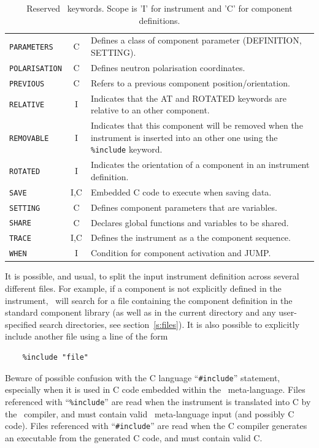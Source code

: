 \begin{table}
\begin{center}
{\begin{tabular}{|l|c|p{}|}
      \texttt{PARAMETERS} & C & Defines a class of component parameter (DEFINITION, SETTING). \\
      \texttt{POLARISATION} & C & Defines neutron polarisation coordinates. \\
      \texttt{PREVIOUS} & C & Refers to a previous component position/orientation.\\
      \texttt{RELATIVE} & I & Indicates that the AT and ROTATED keywords are relative to an other component. \\
      \texttt{REMOVABLE} & I & Indicates that this component will be removed when the instrument is inserted into an other one using the \texttt{\%include} keyword. \\
      \texttt{ROTATED} & I & Indicates the orientation of a component in an instrument definition. \\
      \texttt{SAVE} & I,C & Embedded C code to execute when saving data. \\
      \texttt{SETTING} & C & Defines component parameters that are
      variables. \\
      \texttt{SHARE} & C & Declares global functions and variables to be shared. \\
      \texttt{TRACE} & I,C & Defines the instrument as a the component sequence. \\
      \texttt{WHEN}  & I & Condition for component activation and JUMP.\\
      \hline
    \end{tabular}
    \caption{Reserved \MCS\ keywords.
    Scope is 'I' for instrument and 'C' for component definitions.}
    \label{t:keywords}
    }
  \end{center}
\end{table}

It is possible, and usual, to split the input instrument definition
across several different files. For example, if a component is not
explicitly defined in the instrument,
\MCS\ will search for a file containing the component definition in the
standard component library (as well as in the current directory and any
user-specified search directories, see section~\ref{s:files}). It is
also possible to explicitly include another file using a line of the
form 
\begin{lstlisting}
    %include "file"
\end{lstlisting}
Beware of possible confusion with the C language ``\verb+#include+''
statement, especially when it is used in C code embedded within the
\MCS\ meta-language. Files referenced with ``\verb+%include+'' are read
when the instrument is translated into C by the \MCS\ compiler, and must
contain valid \MCS\ meta-language input (and possibly C code). Files referenced with
``\verb+#include+'' are read when the C compiler generates an
executable from the generated C code, and must contain valid C.

